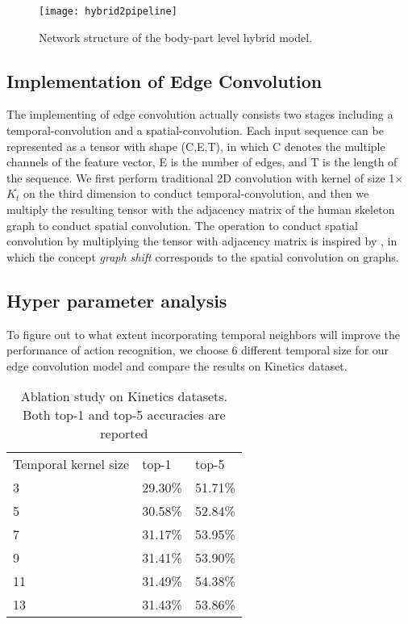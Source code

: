 \documentclass[a4paper,11pt]{article}
\begin{document}
\begin{figure}
\centering
\texttt{[image: hybrid2pipeline]}
\caption{Network structure of the body-part level hybrid model.}
\label{fig:example}
\end{figure}


\subsection{Implementation of Edge Convolution}
The implementing of edge convolution actually consists two stages including a temporal-convolution and a spatial-convolution. Each input sequence can be represented as a tensor with shape (C,E,T), in which C denotes the multiple channels of the feature vector, E is the number of edges, and T is the length of the sequence. We first perform traditional 2D convolution with kernel of size 1$\times$$K_t$ on the third dimension to conduct temporal-convolution, and then we multiply the resulting tensor with the adjacency matrix of the human skeleton graph to conduct spatial convolution. The operation to conduct spatial convolution by multiplying the tensor with adjacency matrix is inspired by \cite{sandryhaila2013discrete}, in which the concept {\it graph shift} corresponds to the spatial convolution on graphs.


\subsection{Hyper parameter analysis}
To figure out to what extent incorporating temporal neighbors will improve the performance of action recognition, we choose 6 different temporal size for our edge convolution model and compare the results on Kinetics dataset.

\begin{table}[h]
\begin{center}
\caption{Ablation study on Kinetics datasets. Both top-1 and top-5 accuracies are reported}
\label{table:ablation}
\begin{tabular}{lll}
\hline\noalign{\smallskip}
Temporal kernel size & top-1 & top-5\\
\noalign{\smallskip}
\hline
\noalign{\smallskip}
3  & 29.30\% & 51.71\% \\
5  & 30.58\% & 52.84\% \\
7  & 31.17\% & 53.95\%\\
9  & 31.41\% & 53.90\%\\
11 & 31.49\% & 54.38\%\\
13 & 31.43\%&53.86\%
\\
\hline
\end{tabular}
\end{center}
\end{table}
\end{document}
